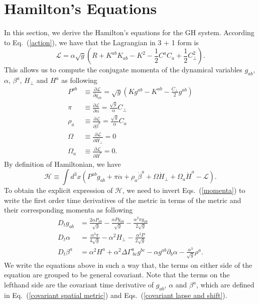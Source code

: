 \documentclass[letterpaper,nofootinbib,prd,amsmath,onecolumn]{revtex4-1}
\begin{document}
\section{Hamilton's Equations}\label{hamiltonian}
In this section, we derive the Hamilton's equations for the GH system. 
According to Eq.~(\ref{action}), we have that the Lagrangian in 3 + 1 form is
\begin{equation}
\mathscr{L} = \alpha \sqrt{g} \left( R + K^{ab}K_{ab} - K^{2} - \frac{1}{2}C^{a}C_{a} + \frac{1}{2}C_{\perp}^{2}\right).
\end{equation}
This allows us to compute the conjugate momenta of the dynamical variables $g_{ab}$, $\alpha$, $\beta^{a}$, $H_{\perp}$ and $H^{a}$ as following
\begin{subequations}\label{momenta}
\begin{align}
P^{ab} & \equiv \frac{\partial \mathscr{L}}{\partial {\dot g}_{ab}} = \sqrt{g}\left(Kg^{ab} - K^{ab} - \frac{C_{\perp}}{2}g^{ab}\right)\\
\pi & \equiv \frac{\partial \mathscr{L}}{\partial {\dot \alpha}} = \frac{\sqrt{g}}{\alpha}C_{\perp}\\
\rho_{a} & \equiv \frac{\partial \mathscr{L}}{\partial {\dot \beta}^{a}} = \frac{\sqrt{g}}{\alpha}C_{a}\\
\Omega & \equiv \frac{\partial \mathscr{L}}{\partial {\dot H}_{\perp}} = 0\\
\Omega_{a} & \equiv \frac{\partial \mathscr{L}}{\partial {\dot H}^{a}} = 0.  
\end{align}
\end{subequations}
By definition of Hamiltonian, we have
\begin{equation}
\mathscr{H} \equiv \int d^{3}x \left(P^{ab}{\dot g}_{ab} + \pi{\dot \alpha} + \rho_{a}{\dot \beta}^{a} + \Omega {\dot H}_{\perp} + \Omega_{a}{\dot H}^{a} - \mathscr{L} \right). 
\end{equation}
To obtain the explicit expression of $\mathscr{H}$, we need to invert Eqs.~(\ref{momenta}) to write the first order time derivatives of the metric in terms of the metric and their corresponding momenta as following
\begin{subequations}
\begin{align}
D_{t}g_{ab} & = \frac{2\alpha P_{ab}}{\sqrt{g}} - \frac{\alpha P g_{ab}}{\sqrt{g}} - \frac{\alpha^{2}\pi g_{ab}}{2\sqrt{g}}\\
D_{t}\alpha & = \frac{\alpha^{3}\pi}{4\sqrt{g}} - \alpha^{2}H_{\perp} - \frac{\alpha^{2}P}{2\sqrt{g}}\\
D_{t}\beta^{a} & = \alpha^{2}H^{a} + \alpha^{2}\Delta \Gamma^{a}_{~bc}g^{bc} - \alpha g^{ab}\partial_{b}\alpha - \frac{\alpha^{3}}{\sqrt{g}}\rho^{a}.
\end{align}
\end{subequations}
We write the equations above in such a way that, the terms on either side of the equation are grouped to be general covariant\cite{Meng}. Note that the terms on the lefthand side are the covariant time derivative of $g_{ab}$, $\alpha$ and $\beta^{a}$, which are defined in Eq.~(\ref{covariant spatial metric}) and Eqs.~(\ref{covariant lapse and shift}). 
\end{document}
